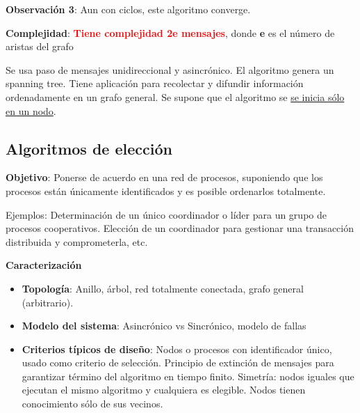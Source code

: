 \textbf{Observación 3}: Aun con ciclos, este algoritmo converge.

\textbf{Complejidad}: \textcolor{red}{\textbf{Tiene complejidad 2e mensajes}}, donde \textbf{e} es el número de aristas del grafo

Se usa paso de mensajes unidireccional y asincrónico. El algoritmo genera un spanning tree. Tiene aplicación para recolectar y difundir información ordenadamente en un grafo general. Se supone que el algoritmo se \underline{se inicia sólo en un nodo}.

\subsection{Algoritmos de elección}
\textbf{Objetivo}: Ponerse de acuerdo en una red de procesos, suponiendo que los procesos están únicamente identificados y es posible ordenarlos totalmente.

Ejemplos: Determinación de un único coordinador o líder para un grupo de procesos cooperativos. Elección de un coordinador para gestionar una transacción distribuida y comprometerla, etc.

\vspace{0.5em}

\textbf{Caracterización} \begin{itemize}
    \item \textbf{Topología}: Anillo, árbol, red totalmente conectada, grafo general (arbitrario).
    \item \textbf{Modelo del sistema}: Asincrónico vs Sincrónico, modelo de fallas
    \item \textbf{Criterios típicos de diseño}: Nodos o procesos con identificador único, usado como criterio de selección. Principio de extinción de mensajes para garantizar término del algoritmo en tiempo finito. Simetría: nodos iguales que ejecutan el mismo algoritmo y cualquiera es elegible. Nodos tienen conocimiento sólo de sus vecinos.
\end{itemize}